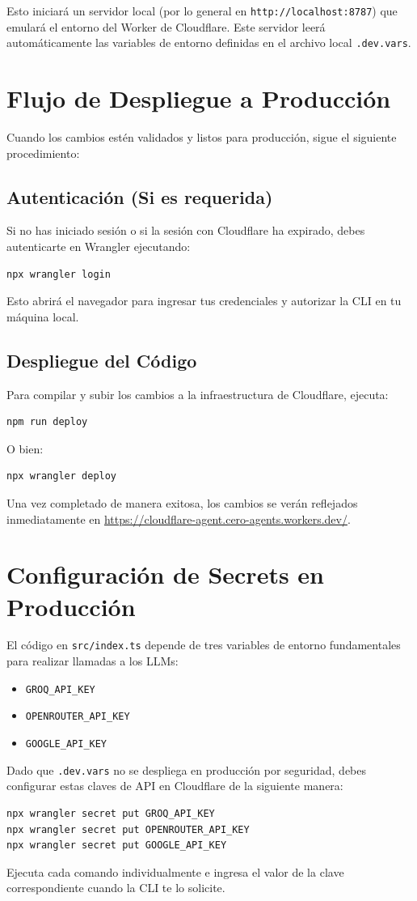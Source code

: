 \documentclass[11pt,a4paper]{article}
\begin{document}
Esto iniciará un servidor local (por lo general en \texttt{http://localhost:8787}) que emulará el entorno del Worker de Cloudflare. Este servidor leerá automáticamente las variables de entorno definidas en el archivo local \texttt{.dev.vars}.

\section{Flujo de Despliegue a Producción}
Cuando los cambios estén validados y listos para producción, sigue el siguiente procedimiento:

\subsection{Autenticación (Si es requerida)}
Si no has iniciado sesión o si la sesión con Cloudflare ha expirado, debes autenticarte en Wrangler ejecutando:
\begin{lstlisting}[language=bash]
npx wrangler login
\end{lstlisting}
Esto abrirá el navegador para ingresar tus credenciales y autorizar la CLI en tu máquina local.

\subsection{Despliegue del Código}
Para compilar y subir los cambios a la infraestructura de Cloudflare, ejecuta:
\begin{lstlisting}[language=bash]
npm run deploy
\end{lstlisting}
O bien:
\begin{lstlisting}[language=bash]
npx wrangler deploy
\end{lstlisting}
Una vez completado de manera exitosa, los cambios se verán reflejados inmediatamente en \href{https://cloudflare-agent.cero-agents.workers.dev/}{https://cloudflare-agent.cero-agents.workers.dev/}.

\section{Configuración de Secrets en Producción}
El código en \texttt{src/index.ts} depende de tres variables de entorno fundamentales para realizar llamadas a los LLMs:
\begin{itemize}
    \item \texttt{GROQ\_API\_KEY}
    \item \texttt{OPENROUTER\_API\_KEY}
    \item \texttt{GOOGLE\_API\_KEY}
\end{itemize}

Dado que \texttt{.dev.vars} no se despliega en producción por seguridad, debes configurar estas claves de API en Cloudflare de la siguiente manera:

\begin{lstlisting}[language=bash]
npx wrangler secret put GROQ_API_KEY
npx wrangler secret put OPENROUTER_API_KEY
npx wrangler secret put GOOGLE_API_KEY
\end{lstlisting}

Ejecuta cada comando individualmente e ingresa el valor de la clave correspondiente cuando la CLI te lo solicite.
\end{document}
